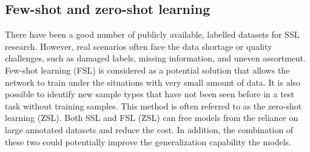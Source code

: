 \documentclass[a4paper,fleqn]{cas-dc}
\begin{document}
\subsection{Few-shot and zero-shot learning}
There have been a good number of publicly available, labelled datasets for SSL research. However, real scenarios often face the data shortage or quality challenges, such as damaged labels, missing information, and uneven assortment. Few-shot learning (FSL) \citep{garcia2017few} is considered as a potential solution that allows the network to train under the situations with very small amount of data. It is also possible to identify new sample types that have not been seen before in a test task without training samples. This method is often referred to as the zero-shot learning (ZSL). Both SSL and FSL (ZSL) \citep{romera2015embarrassingly} can free models from the reliance on large annotated datasets and reduce the cost. In addition, the combination of these two could potentially improve the generalization capability the models.


\end{document}
